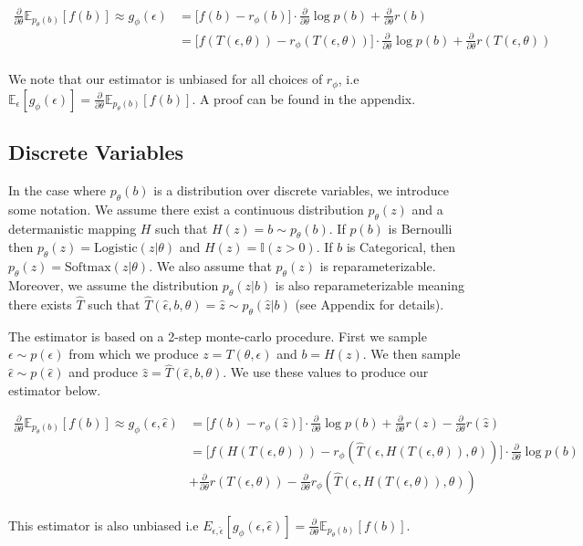 \documentclass{article}
\newcommand{\E}{\mathbb{E}}
\newcommand{\PT}{\frac{\partial}{\partial \theta}}
\newcommand{\LP}[1]{\PT \log p(#1)}
\begin{document}
\begin{align}
\PT\E_{p_\theta(b)}[f(b)] \approx g_\phi(\epsilon) &= \Big[f(b) - r_\phi(b)\Big]\cdot\LP{b} + \PT r(b)\\
&= \Big[f(T(\epsilon, \theta)) - r_\phi(T(\epsilon, \theta))\Big]\cdot\LP{b} + \PT r(T(\epsilon, \theta))\\
\end{align}

We note that our estimator is unbiased for all choices of $r_\phi$, i.e $\E_\epsilon[g_\phi(\epsilon)] = \PT\E_{p_\theta(b)}[f(b)]$. A proof can be found in the appendix. 

\subsection{Discrete Variables}
In the case where $p_\theta(b)$ is a distribution over discrete variables, we introduce some notation. We assume there exist a continuous distribution $p_\theta(z)$ and a determanistic mapping $H$ such that $H(z) = b \sim p_\theta(b)$. If $p(b)$ is Bernoulli then $p_\theta(z) = \text{Logistic}(z|\theta)$ and $H(z) = \mathbb{I}(z>0)$. If $b$ is Categorical, then $p_\theta(z) = \text{Softmax}(z|\theta)$. We also assume that $p_\theta(z)$ is reparameterizable. Moreover, we assume the distribution $p_\theta(z|b)$ is also reparameterizable meaning there exists $\hat{T}$ such that $\hat{T}(\hat{\epsilon}, b, \theta) = \hat{z} \sim p_\theta(\hat{z}|b)$ (see Appendix for details).  

The estimator is based on a 2-step monte-carlo procedure. First we sample $\epsilon \sim p(\epsilon)$ from which we produce $z = T(\theta, \epsilon)$ and $b = H(z)$. We then sample $\hat{\epsilon} \sim p(\hat{\epsilon})$ and produce $\hat{z} = \hat{T}(\hat{\epsilon}, b, \theta)$. We use these values to produce our estimator below.

\begin{align}
\PT\E_{p_\theta(b)}[f(b)] \approx g_\phi(\epsilon,\hat{\epsilon}) &= \Big[f(b) - r_\phi(\hat{z})\Big]\cdot\LP{b} + \PT r(z) - \PT r(\hat{z})\\
&= \Big[f(H(T(\epsilon, \theta))) - r_\phi(\hat{T}(\epsilon, H(T(\epsilon, \theta)), \theta))\Big]\cdot\LP{b}\\ 
&+ \PT r(T(\epsilon, \theta)) - \PT r_\phi(\hat{T}(\epsilon, H(T(\epsilon, \theta)), \theta))\\
\end{align}

This estimator is also unbiased i.e $E_{\epsilon, \hat{\epsilon}}[g_\phi(\epsilon, \hat{\epsilon})] = \PT\E_{p_\theta(b)}[f(b)]$.
\end{document}
